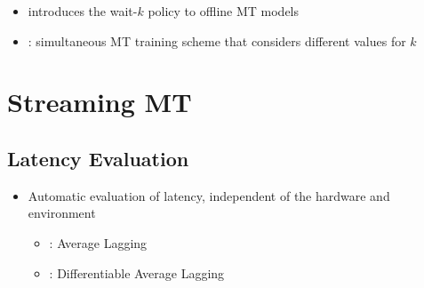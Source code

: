 \documentclass[landscape]{article}
\begin{document}
\begin{itemize}
	\item {} introduces the wait-$k$ policy to offline MT models
	\item {}: simultaneous MT training scheme that considers different values for $k$
\end{itemize}

\cp
\section*{Streaming MT}
\subsection*{Latency Evaluation}
\vspace*{5mm}
\begin{itemize}\itemsep=5mm
	\item Automatic evaluation of latency, independent of the hardware and environment 
	\begin{itemize}\itemsep=5mm
		\item {}: Average Lagging
		\item {}: Differentiable Average Lagging
	\end{itemize}
\end{itemize}
\vspace*{2cm}
\end{document}
